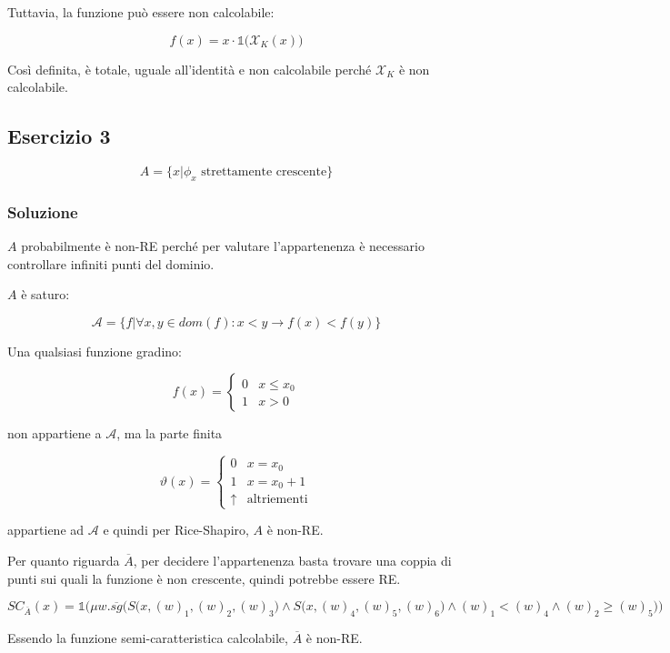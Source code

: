 Tuttavia, la funzione può essere non calcolabile:

$$
f(x) = x \cdot \mathbb{1}\Big(\mathcal{X}_K(x)\Big)
$$

Così definita, è totale, uguale all'identità e non calcolabile perché $\mathcal{X}_K$ è non calcolabile.

\subsection{Esercizio 3}

$$
A = \{ x | \phi_x \text{ strettamente crescente}  \}
$$

\subsubsection{Soluzione}

$A$ probabilmente è non-RE perché per valutare l'appartenenza è necessario controllare infiniti punti del dominio.

$A$ è saturo:

$$
\mathcal{A} = \{f | \forall x,y \in dom(f) : x < y \rightarrow f(x) < f(y) \}
$$

Una qualsiasi funzione gradino:

$$
f(x) = \begin{cases}
0 & x \leq x_0 \\
1 & x > 0
\end{cases}
$$

non appartiene a $\mathcal{A}$, ma la parte finita 

$$
\vartheta(x) = \begin{cases}
0 & x= x_0 \\
1 & x = x_0+1 \\
\uparrow &\text{altriementi}
\end{cases}
$$

appartiene ad $\mathcal{A}$ e quindi per Rice-Shapiro, $A$ è non-RE.

Per quanto riguarda $\overline{A}$, per decidere l'appartenenza basta trovare una coppia di punti sui quali la funzione è non crescente, quindi potrebbe essere RE.

$$
SC_{\overline{A}}(x) =\mathbb{1} \Bigg( \mu w . \overline{sg}\bigg(S\Big(x, (w)_1, (w)_2, (w)_3 \Big) \wedge S\Big(x, (w)_4, (w)_5, (w)_6 \Big) \wedge (w)_1 < (w)_4 \wedge (w)_2 \geq (w)_5\bigg) \Bigg)
$$

Essendo la funzione semi-caratteristica calcolabile, $\overline{A}$ è non-RE.

